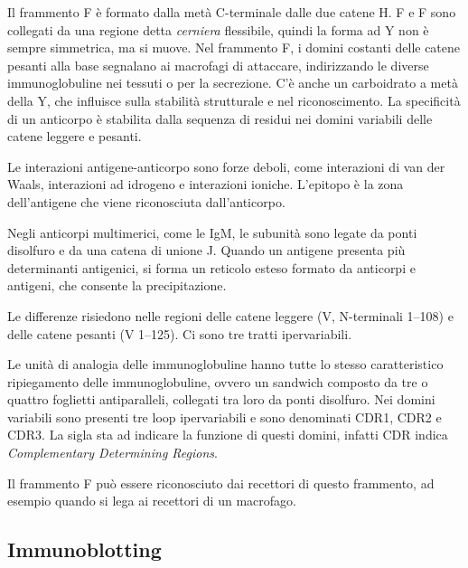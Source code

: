 Il frammento F è formato dalla metà C-terminale dalle due catene H. F e F sono collegati da una regione detta \emph{cerniera} flessibile, quindi la forma ad Y non è sempre simmetrica, ma si muove. Nel frammento F, i domini costanti delle catene pesanti alla base segnalano ai macrofagi di attaccare, indirizzando le diverse immunoglobuline nei tessuti o per la secrezione.
C'è anche un carboidrato a metà della Y, che influisce sulla stabilità strutturale e nel riconoscimento. La specificità di un anticorpo è stabilita dalla sequenza di residui nei domini variabili delle catene leggere e pesanti.


Le interazioni antigene-anticorpo sono forze deboli, come interazioni di van der Waals, interazioni ad idrogeno e interazioni ioniche. L'epitopo è la zona dell'antigene che viene riconosciuta dall'anticorpo.


Negli anticorpi multimerici, come le IgM, le subunità sono legate da ponti disolfuro e da una catena di unione J. Quando un antigene presenta più determinanti antigenici, si forma un reticolo esteso formato da anticorpi e antigeni, che consente la precipitazione.

Le differenze risiedono nelle regioni delle catene leggere (V, N-terminali 1--108) e delle catene pesanti (V 1--125). Ci sono tre tratti ipervariabili.

Le unità di analogia delle immunoglobuline hanno tutte lo stesso caratteristico ripiegamento delle immunoglobuline, ovvero un sandwich composto da tre o quattro foglietti \beta{} antiparalleli, collegati tra loro da ponti disolfuro. Nei domini variabili sono presenti tre loop ipervariabili e sono denominati CDR1, CDR2 e CDR3. La sigla sta ad indicare la funzione di questi domini, infatti CDR indica \emph{Complementary Determining Regions}.

Il frammento F può essere riconosciuto dai recettori di questo frammento, ad esempio quando si lega ai recettori di un macrofago.


\subsection{Immunoblotting}

